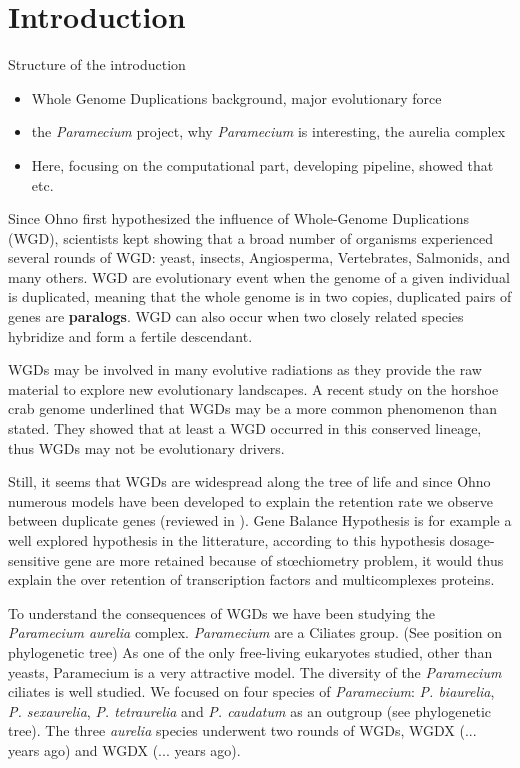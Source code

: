 \section*{Introduction}

Structure of the introduction
\newline
\begin{itemize}
\item Whole Genome Duplications background, major evolutionary force
\item the \textit{Paramecium} project, why \textit{Paramecium} is interesting, the aurelia complex
\item Here, focusing on the computational part, developing pipeline, showed that etc.
\end{itemize}

Since Ohno first hypothesized the influence of Whole-Genome Duplications (WGD), scientists kept showing that a broad number of organisms experienced several rounds of WGD: yeast, insects, Angiosperma, Vertebrates, Salmonids, and many others. WGD are evolutionary event when the genome of a given individual is duplicated, meaning that the whole genome is in two copies, duplicated pairs of genes are \textbf{paralogs}. WGD can also occur when two closely related species hybridize and form a fertile descendant.

WGDs may be involved in many evolutive radiations as they provide the raw material to explore new evolutionary landscapes. A recent study on the horshoe crab genome underlined that WGDs may be a more common phenomenon than stated. They showed that at least a WGD occurred in this conserved lineage, thus WGDs may not be evolutionary drivers.

Still, it seems that WGDs are widespread along the tree of life and since Ohno numerous models have been developed to explain the retention rate we observe between duplicate genes (reviewed in ). Gene Balance Hypothesis is for example a well explored hypothesis in the litterature, according to this hypothesis dosage-sensitive gene are more retained because of stœchiometry problem, it would thus explain the over retention of transcription factors and multicomplexes proteins.

To understand the consequences of WGDs we have been studying the \textit{Paramecium aurelia} complex. \textit{Paramecium} are a Ciliates group. (See position on phylogenetic tree) As one of the only free-living eukaryotes studied, other than yeasts, Paramecium is a very attractive model. The diversity of the \textit{Paramecium} ciliates is well studied. We focused on four species of \textit{Paramecium}: \textit{P. biaurelia}, \textit{P. sexaurelia}, \textit{P. tetraurelia} and \textit{P. caudatum} as an outgroup (see phylogenetic tree). The three \textit{aurelia} species underwent two rounds of WGDs, WGDX (... years ago) and WGDX (... years ago).

